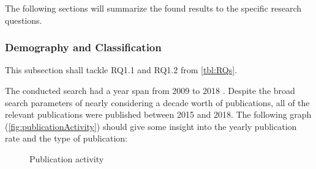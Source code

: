 The following sections will summarize the found results to
the specific research questions.

\subsubsection{Demography and Classification}

This subsection shall tackle RQ1.1 and RQ1.2 from \autoref{tbl:RQs}.

The conducted search had a year span from 2009 to 2018 \cite{waseem:SMSMSADevOps}.
Despite the broad search parameters of nearly considering a decade worth
of publications, all of the relevant publications were published between
2015 and 2018. The following graph (\autoref{fig:publicationActivity})
should give some insight into the yearly publication rate and the type of publication:

\begin{figure}[h]
    \caption{Publication activity}
    \label{fig:publicationActivity}
\end{figure}

